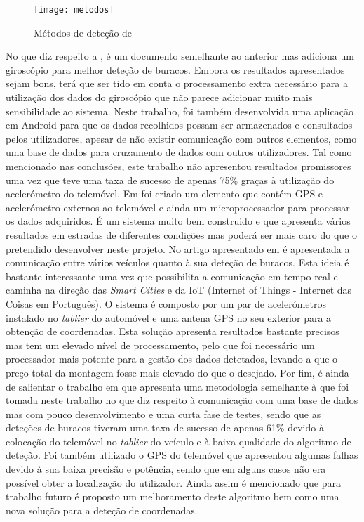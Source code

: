 \begin{figure}[hbtp]
	\centering
	\texttt{[image: metodos]}
	\caption[Métodos de deteção de \cite{Mednis2011}]{Métodos de deteção de \cite{Mednis2011}}
	\label{fig:metodos}
\end{figure}

No que diz respeito a \cite{Fouad}, é um documento semelhante ao anterior mas adiciona um giroscópio para melhor deteção de buracos. Embora os resultados apresentados sejam bons, terá que ser tido em conta o processamento extra necessário para a utilização dos dados do giroscópio que não parece adicionar muito mais sensibilidade ao sistema.
Neste trabalho, foi também desenvolvida uma aplicação em Android para que os dados recolhidos possam ser armazenados e consultados pelos utilizadores, apesar de não existir comunicação com outros elementos, como uma base de dados para cruzamento de dados com outros utilizadores.
Tal como mencionado nas conclusões, este trabalho não apresentou resultados promissores uma vez que teve uma taxa de sucesso de apenas 75\% graças à utilização do acelerómetro do telemóvel.
Em \cite{Chen2011} foi criado um elemento que contém GPS e acelerómetro externos ao telemóvel e ainda um microprocessador para processar os dados adquiridos. É um sistema muito bem construido e que apresenta vários resultados em estradas de diferentes condições mas poderá ser mais caro do que o pretendido desenvolver neste projeto. No artigo apresentado em \cite{Jang} é apresentada a comunicação entre vários veículos quanto à sua deteção de buracos. Esta ideia é bastante interessante uma vez que possibilita a comunicação em tempo real e caminha na direção das \emph{Smart Cities} e da IoT (Internet of Things - Internet das Coisas em Português).
O sistema é composto por um par de acelerómetros instalado no \emph{tablier} do automóvel e uma antena GPS no seu exterior para a obtenção de coordenadas.
Esta solução apresenta resultados bastante precisos mas tem um elevado nível de processamento, pelo que foi necessário um processador mais potente para a gestão dos dados detetados, levando a que o preço total da montagem fosse mais elevado do que o desejado. 
Por fim, é ainda de salientar o trabalho em \cite{Kattan2014} que apresenta uma metodologia semelhante à que foi tomada neste trabalho no que diz respeito à comunicação com uma base de dados mas com pouco desenvolvimento e uma curta fase de testes, sendo que as deteções de buracos tiveram uma taxa de sucesso de apenas 61\% devido à colocação do telemóvel no \emph{tablier} do veículo e à baixa qualidade do algoritmo de deteção.
Foi também utilizado o GPS do telemóvel que apresentou algumas falhas devido à sua baixa precisão e potência, sendo que em alguns casos não era possível obter a localização do utilizador.
Ainda assim é mencionado que para trabalho futuro é proposto um melhoramento deste algoritmo bem como uma nova solução para a deteção de coordenadas.

